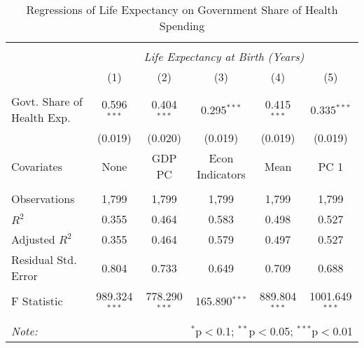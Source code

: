 \begin{table}[!htbp] \centering
  \caption{Regressions of Life Expectancy on Government Share of Health Spending \label{main_regs}}
\begin{tabular}{@{\extracolsep{5pt}}lccccc}
\\[-1.8ex]\hline
\hline \\[-1.8ex]
& \multicolumn{5}{c}{\textit{Life Expectancy at Birth (Years)}} \
\cr \
\\[-1.8ex] & (1) & (2) & (3) & (4) & (5) \\
\hline \\[-1.8ex]
 Govt. Share of Health Exp. & 0.596$^{***}$ & 0.404$^{***}$ & 0.295$^{***}$ & 0.415$^{***}$ & 0.335$^{***}$ \\
  & (0.019) & (0.020) & (0.019) & (0.019) & (0.019) \\
 Covariates & None & GDP PC & Econ Indicators & Mean & PC 1 \\
\hline \\[-1.8ex]
 Observations & 1,799 & 1,799 & 1,799 & 1,799 & 1,799 \\
 $R^2$ & 0.355 & 0.464 & 0.583 & 0.498 & 0.527 \\
 Adjusted $R^2$ & 0.355 & 0.464 & 0.579 & 0.497 & 0.527 \\
 Residual Std. Error & 0.804 & 0.733 & 0.649 & 0.709 & 0.688  \\
 F Statistic & 989.324$^{***}$  & 778.290$^{***}$  & 165.890$^{***}$  & 889.804$^{***}$  & 1001.649$^{***}$  \\
\hline
\hline \\[-1.8ex]
\textit{Note:} & \multicolumn{5}{r}{$^{*}$p$<$0.1; $^{**}$p$<$0.05; $^{***}$p$<$0.01} \\
\end{tabular}
\end{table}